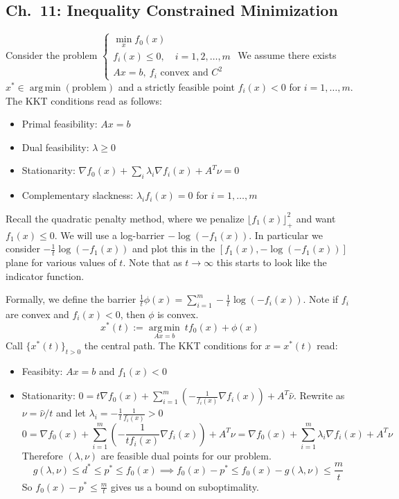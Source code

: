 \documentclass[english, 11pt]{article}
\DeclareMathOperator*{\argmin}{arg\,min}
\begin{document}
\subsection{Ch.\ 11: Inequality Constrained Minimization}
Consider the problem $\begin{cases} 
  \min \limits_x f_0(x) \\
  f_i(x) \le 0, \quad i=1,2,\dots,m \\
 Ax=b, \ f_i \text{ convex and } C^2
  \end{cases}$ We assume there exists $x^* \in \argmin(\text{problem})$ and a strictly feasible point $f_i(x)<0$ for $i=1,\dots,m$. The KKT conditions read as follows:
  \begin{itemize}
  \item Primal feasibility: $Ax=b$
  \item Dual feasibility: $\lambda \ge 0$ 
  \item Stationarity: $\nabla f_0(x) + \sum_i \lambda_i \nabla f_i(x) + A^T \nu=0$
  \item Complementary slackness: $\lambda_i f_i(x) =0$ for $i=1,\dots,m$
  \end{itemize}
Recall the quadratic penalty method, where we penalize $\lfloor f_1(x) \rfloor_{+}^2$ and want $f_1(x) \le 0$. We will use a log-barrier $- \log (-f_1(x))$. In particular we consider $- \frac{1}{t} \log ( - f_1(x) )$ and plot this in the $[f_1(x), - \log(-f_1(x))]$ plane for various values of $t$. Note that as $t \to \infty$ this starts to look like the indicator function.

Formally, we define the barrier $\frac{1}{t} \phi(x) = \sum_{i=1}^m - \frac{1}{t} \log (- f_i(x))$. Note if $f_i$ are convex and $f_i(x) < 0$, then $\phi$ is convex. 
\[
x^*(t) := \argmin \limits_{Ax=b} \ t f_0(x) + \phi(x) 
\]
Call $\{x^*(t)\}_{t >0}$ the central path. The KKT conditions for $x=x^*(t)$ read:
\begin{itemize}
\item Feasibity: $Ax=b$ and $f_1(x)<0$
\item Stationarity: $0 = t \nabla f_0(x) + \sum_{i=1}^m \left( - \frac{1}{f_i(x) } \nabla f_i(x) \right) + A^T \hat{\nu} $.  Rewrite as $\nu = \hat{\nu}/t$ and let $\lambda_i = - \frac{1}{t} \frac{1}{f_i(x)}>0$
\[
0 =  \nabla f_0(x) + \sum_{i=1}^m \left( - \frac{1}{ t f_i(x) } \nabla f_i(x) \right) + A^T \nu  
= \nabla f_0(x) + \sum_{i=1}^m \lambda_i \nabla f_i(x) + A^T \nu
\]
Therefore $(\lambda,\nu)$ are feasible dual points for our problem.
\[
 g(\lambda,\nu) \le d^* \le p^* \le f_0(x) 
 \implies f_0(x) - p^* \le f_0(x) - g(\lambda,\nu) \le \frac{m}{t} %
\]
So $f_0(x) - p^* \le \frac{m}{t}$ gives us a bound on suboptimality.
\end{itemize}
\end{document}

